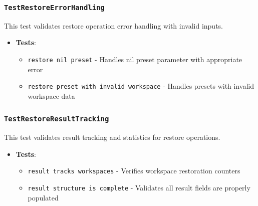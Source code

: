 \subsubsection*{\texttt{TestRestoreErrorHandling}}
This test validates restore operation error handling with invalid inputs.
\begin{itemize}
    \item \textbf{Tests}:
    \begin{itemize}
        \item \texttt{restore nil preset} - Handles nil preset parameter with appropriate error
        \item \texttt{restore preset with invalid workspace} - Handles presets with invalid workspace data
    \end{itemize}
\end{itemize}

\subsubsection*{\texttt{TestRestoreResultTracking}}
This test validates result tracking and statistics for restore operations.
\begin{itemize}
    \item \textbf{Tests}:
    \begin{itemize}
        \item \texttt{result tracks workspaces} - Verifies workspace restoration counters
        \item \texttt{result structure is complete} - Validates all result fields are properly populated
    \end{itemize}
\end{itemize}
